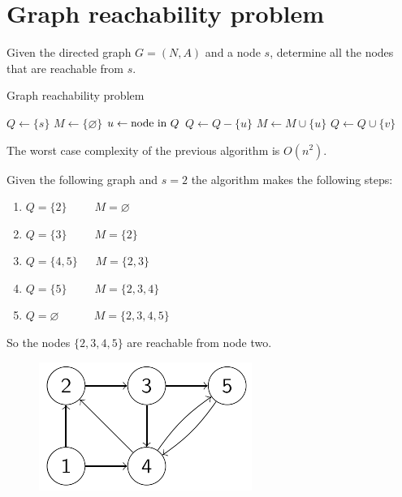 \documentclass[12pt, a4paper]{report}
\begin{document}
    \section{Graph reachability problem}
    Given the directed graph $G=(N,A)$ and a node $s$, determine all the nodes that are reachable from $s$. 
    \begin{algorithm}[H]
        \caption{Graph reachability problem}
            \begin{algorithmic}[1]
                \State $Q \leftarrow \{s\}$
                \State $M \leftarrow \{\varnothing\}$
                    \State $u \leftarrow \textnormal{node in } Q$
                    \State $Q \leftarrow Q-\{u\}$
                    \State $M \leftarrow M \cup \{u\}$
                            \State $Q \leftarrow Q \cup \{v\}$
                        \EndIf
                    \EndFor
                \EndWhile
            \end{algorithmic}
    \end{algorithm}
    The worst case complexity of the previous algorithm is $O(n^2)$.
    \begin{example}
        Given the following graph and $s=2$ the algorithm makes the following steps: 
        \begin{enumerate}
            \item $Q=\{2\} \:\:\:\:\:\:\:\:\:\:\: M=\varnothing$
            \item $Q=\{3\} \:\:\:\:\:\:\:\:\:\:\: M=\{2\}$
            \item $Q=\{4,5\} \:\:\:\:\:\:\: M=\{2,3\}$
            \item $Q=\{5\} \:\:\:\:\:\:\:\:\:\:\: M=\{2,3,4\}$
            \item $Q=\varnothing \:\:\:\:\:\:\:\:\:\:\:\:\:\: M=\{2,3,4,5\}$
        \end{enumerate}
        So the nodes $\{2,3,4,5\}$ are reachable from node two. 
        \begin{figure}[H]
            \centering
            \includegraphics[width=0.3\linewidth]{images/graphs.png}
        \end{figure}
    \end{example}
\end{document}
